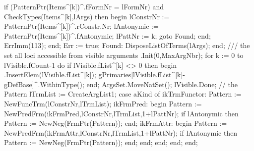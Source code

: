                   if (PatternPtr(Items^[k])^.fFormNr = lFormNr) and
                        CheckTypes(Items^[k],lArgs) then
                  begin
                     lConstrNr := PatternPtr(Items^[k])^.rConstr.Nr;
                     lAntonymic := PatternPtr(Items^[k])^.fAntonymic;
                     lPattNr := k;
                     goto Found;
                  end;
               ErrImm(113);
            end;
            Err := true;
            Found:
               DisposeListOfTerms(lArgs);
         end;
         /// the set all loci accessible from visible arguments
         .Init(0,MaxArgNbr);
         for k := 0 to lVisible.fCount-1 do
            if lVisible.fList^[k] <> 0 then
            begin
               .InsertElem(lVisible.fList^[k]);
               gPrimaries[lVisible.fList^[k]-gDefBase]^.WithinType();
            end;
         ArgsSet.MoveNatSet();
         lVisible.Done;
         // the Pattern
         lTrmList := CreateArgList1;
         case aKind of
            ikTrmFunctor: Pattern := NewFuncTrm(lConstrNr,lTrmList);
            ikFrmPred:
               begin
                  Pattern := NewPredFrm(ikFrmPred,lConstrNr,lTrmList,1+lPattNr);
                  if lAntonymic then Pattern := NewNeg(FrmPtr(Pattern));
               end;
            ikFrmAttr:
               begin
                  Pattern := NewPredFrm(ikFrmAttr,lConstrNr,lTrmList,1+lPattNr);
                  if lAntonymic then Pattern := NewNeg(FrmPtr(Pattern));
               end;
         end;
      end;
   end;
end;
\eatline
